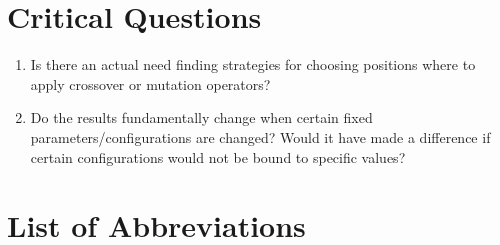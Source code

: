 \documentclass[oneside, notitlepage, twocolumn]{scrartcl}
\begin{document}
\section{Critical Questions}
\begin{enumerate}
    \item Is there an actual need finding strategies for choosing positions where to apply crossover or mutation operators?
    \item Do the results fundamentally change when certain fixed parameters/configurations are changed? Would it have made a difference if certain configurations would not be bound to specific values?
\end{enumerate}

\section{List of Abbreviations}
\begin{acronym}
\end{acronym}

\nocite{*}
\printbibliography
\end{document}
